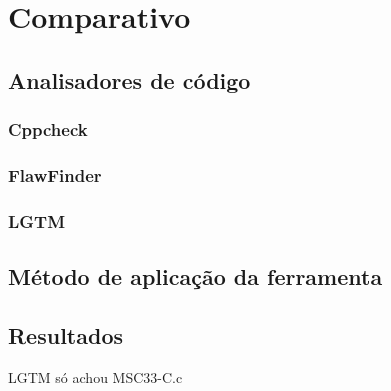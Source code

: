 \chapter{Comparativo}
\label{cap3}
\section{Analisadores de código}
\subsection{Cppcheck}
\subsection{FlawFinder}
\subsection{LGTM}

\section{Método de aplicação da ferramenta}
\section{Resultados}
 LGTM só achou MSC33-C.c
